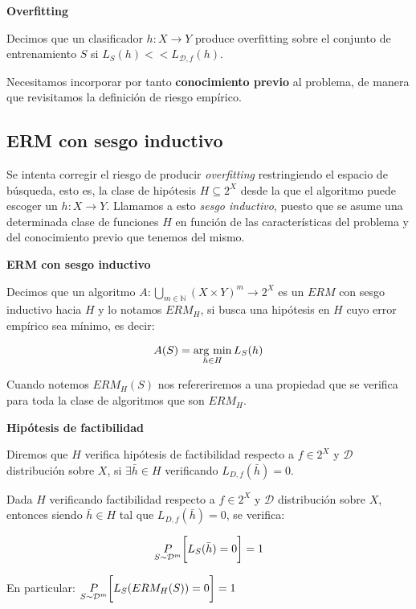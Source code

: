 \begin{definition} \textbf{Overfitting}

 Decimos que un clasificador $h: X\rightarrow Y$ produce overfitting sobre el conjunto de entrenamiento 
 $S$ si $L_S(h) << L_{\mathcal{D},f}(h)$.
\end{definition}

Necesitamos incorporar por tanto \textbf{conocimiento previo} al problema, de manera que revisitamos la definición de riesgo
empírico.

\subsection{ERM con sesgo inductivo}
Se intenta corregir el riesgo de producir \emph{overfitting} restringiendo el espacio de búsqueda, esto es, la clase de 
hipótesis $H \subseteq 2^X$ desde la que el algoritmo puede escoger un $h: X\rightarrow Y$. Llamamos a esto 
\emph{sesgo inductivo}, puesto que se asume una determinada clase de funciones $H$ en función de las 
características del problema y del conocimiento previo que tenemos del mismo.

\begin{definition} \textbf{ERM con sesgo inductivo}

Decimos que un algoritmo $A: \underset{m\in \mathbb{N}}{\bigcup} (X\times Y)^m \rightarrow 2^{X}$ es un $ERM$ con sesgo 
inductivo hacia $H$ y lo notamos $ERM_H$, si busca una hipótesis en $H$ cuyo error empírico 
sea mínimo, es decir:

\[A(S) = \operatorname*{arg\,\min}_{h\in H} L_S(h)\]
\end{definition}

Cuando notemos $ERM_H(S)$ nos refereriremos a una propiedad que se verifica para toda la clase de algoritmos que 
son $ERM_H$.

\begin{definition} \textbf{Hipótesis de factibilidad}

Diremos que $H$ verifica hipótesis de factibilidad respecto a $f\in 2^X$ y $\mathcal{D}$ distribución sobre $X$, si 
$\exists {\bar{h}} \in H$ verificando $L_{D,f}(\bar{h}) = 0$.
\end{definition}

\begin{fact}
Dada $H$ verificando factibilidad respecto a $f\in 2^X$ y $\mathcal{D}$ distribución sobre $X$, entonces siendo 
${\bar{h}} \in H$ tal que $L_{D,f}(\bar{h}) = 0$, se verifica:

\[\underset{S\sim \mathcal{D}^m}{P} \bigg[L_S(\bar{h}) = 0 \bigg] = 1\]

En particular: $\underset{S\sim \mathcal{D}^m}{P} \bigg[L_S(ERM_H(S)) = 0 \bigg] = 1$
\label{fact:ermh}
\end{fact}

